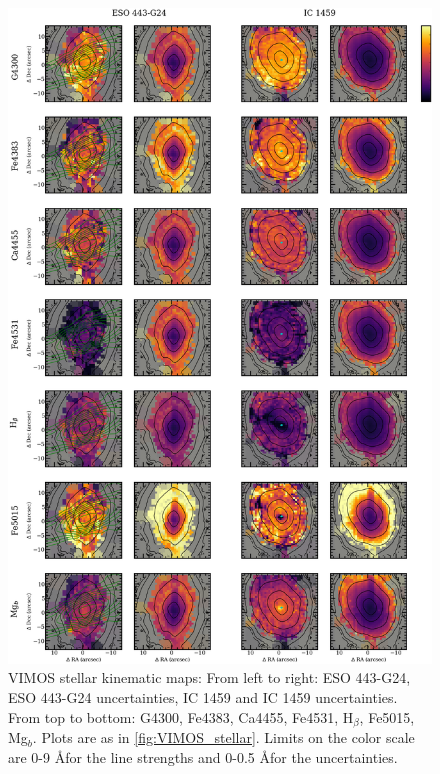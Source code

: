 		\begin{figure}
			\centering
			\includegraphics[height=0.94\textheight]{chapter4/vimos/abs1.png}
			\caption[VIMOS absorption line strength maps]{VIMOS stellar kinematic maps: From left to right: ESO 443-G24, ESO 443-G24 uncertainties, IC 1459 and IC 1459 uncertainties. From top to bottom: G4300, Fe4383, Ca4455, Fe4531, H$_\beta$, Fe5015, Mg$_b$. Plots are as in \ref{fig:VIMOS_stellar}. Limits on the color scale are 0-9 \AA  for the line strengths and 0-0.5 \AA  for the uncertainties.}
			\label{fig:VIMOS_absorption}
		\end{figure}
